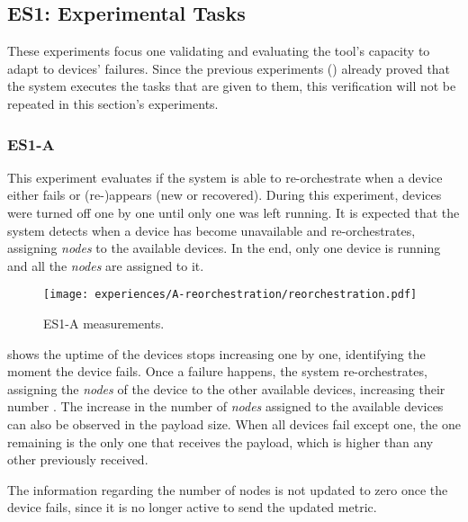 
\subsection{ES1: Experimental Tasks}\label{sec:discussion_scenario1_exp}

These experiments focus one validating and evaluating the tool's capacity to adapt to devices' failures. Since the previous experiments (\cf {}) already proved that the system executes the tasks that are given to them, this verification will not be repeated in this section's experiments.

\subsubsection{ES1-A}\label{sec:exp_a}

This experiment evaluates if the system is able to re-orchestrate when a device either fails or (re-)appears (\ie new or recovered). During this experiment, devices were turned off one by one until only one was left running. It is expected that the system detects when a device has become unavailable and re-orchestrates, assigning \textit{nodes} to the available devices. In the end, only one device is running and all the \textit{nodes} are assigned to it.

\begin{figure}[h]
\centering
\texttt{[image: experiences/A-reorchestration/reorchestration.pdf]}
\caption[ES1-A measurements]{ES1-A measurements.}\label{fig:experiment_a_graph}
\end{figure}

 shows the uptime of the devices stops increasing one by one, identifying the moment the device fails. Once a failure happens, the system re-orchestrates, assigning the \textit{nodes} of the device to the other available devices, increasing their number . The increase in the number of \textit{nodes} assigned to the available devices can also be observed in the payload size. When all devices fail except one, the one remaining is the only one that receives the payload, which is higher than any other previously received.

The information regarding the number of nodes is not updated to zero once the device fails, since it is no longer active to send the updated metric. 

